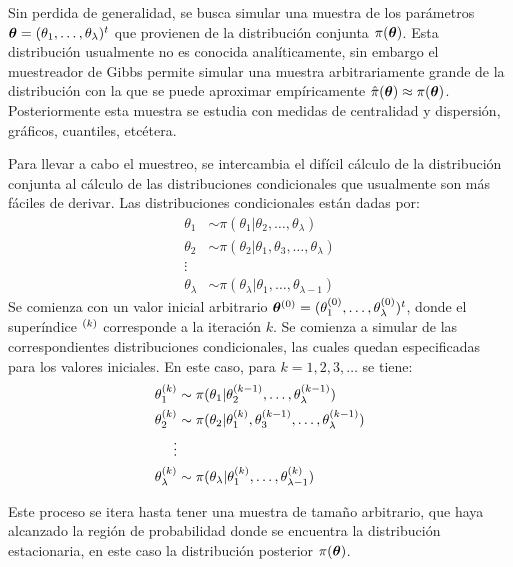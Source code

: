 \documentclass[../Main/Main.tex]{subfiles}
\begin{document}
Sin perdida de generalidad, se busca simular una muestra de los parámetros \linebreak $\bm{\theta} = (\theta_1,\ldots,\theta_\lambda)^t$ que provienen de la distribución conjunta $\pi(\bm{\theta})$. Esta distribución usualmente no es conocida analíticamente, sin embargo el muestreador de Gibbs permite simular una muestra arbitrariamente grande de la distribución con la que se puede aproximar empíricamente $\hat{\pi}(\bm{\theta}) \approx \pi(\bm{\theta})$. Posteriormente esta muestra se estudia con medidas de centralidad y dispersión, gráficos, cuantiles, etcétera.

Para llevar a cabo el muestreo, se intercambia el difícil cálculo de la distribución conjunta al cálculo de las distribuciones condicionales que usualmente son más fáciles de derivar. Las distribuciones condicionales están dadas por: 
\begin{align}
	\theta_1 &\sim \pi(\theta_1|\theta_2,\ldots,\theta_\lambda) \label{ec:DistCondicionales}\\
	\theta_2 &\sim \pi(\theta_2|\theta_1,\theta_3,\ldots,\theta_\lambda)\nonumber \\ 
	\vdots \nonumber\\
	\theta_\lambda &\sim \pi(\theta_\lambda|\theta_1,\ldots,\theta_{\lambda-1}) \nonumber
\end{align}
Se comienza con un valor inicial arbitrario $\bm{\theta}^{(0)} = (\theta_1^{(0)},\ldots,\theta_\lambda^{(0)})^t$, donde el superíndice $^{(k)}$ corresponde a la iteración $k$. Se comienza a simular de las correspondientes distribuciones condicionales, las cuales quedan especificadas para los valores iniciales. En este caso, para $k = 1,2,3,\ldots$ se tiene:
\begin{align}
	\theta_1^{(k)} &\sim \pi(\theta_1|\theta_2^{(k-1)},\ldots,\theta_\lambda^{(k-1)}) \label{ec:GibbsSampler}\\
	\theta_2^{(k)} &\sim \pi(\theta_2|\theta_1^{(k)},\theta_3^{(k-1)},\ldots,\theta_\lambda^{(k-1)})\nonumber \\ 
	\vdots \nonumber\\
	\theta_\lambda^{(k)} &\sim \pi(\theta_\lambda|\theta_1^{(k)},\ldots,\theta_{\lambda-1}^{(k)}) \nonumber
\end{align}

Este proceso se itera hasta tener una muestra de tamaño arbitrario, que haya alcanzado la región de probabilidad donde se encuentra la distribución estacionaria, en este caso la distribución posterior $\pi(\bm{\theta})$.
\end{document}
